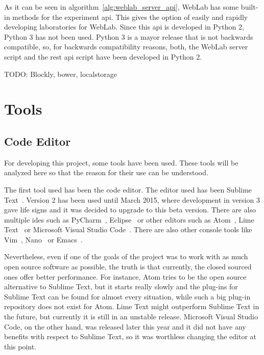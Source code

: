 As it can be seen in algorithm~\ref{alg:weblab_server_api}, WebLab has some built-in methods for the
experiment \acrshort{api}. This gives the option of easily and rapidly developing laboratories for
WebLab. Since this \acrshort{api} is developed in Python 2, Python 3 has not been used. Python 3 is
a mayor release that is not backwards compatible, so, for backwards compatibility reasons, both, the
WebLab server script and the \acrshort{rest} \acrshort{api} script have been developed in Python 2.

TODO: Blockly, bower, localstorage

\section{Tools}

\subsection{Code Editor}

For developing this project, some tools have been used. These tools will be analyzed here so that
the reason for their use can be understood.

The first tool used has been the code editor. The editor used has been Sublime
Text~\cite{sublime_web}. Version 2 has been used until March 2015, where development in version 3
gave life signs and it was decided to upgrade to this beta version. There are also multiple
\acrshort{ide}s such as PyCharm~\cite{pycharm_web}, Eclipse~\cite{eclipse_web} or other editors such
as Atom~\cite{atom_web}, Lime Text~\cite{lime_web} or Microsoft Visual Studio
Code~\cite{ms_code_web}. There are also other console tools like Vim~\cite{vim_web},
Nano~\cite{nano_web} or Emacs~\cite{emacs_web}.

Nevertheless, even if one of the goals of the project was to work with as much open source software
as possible, the truth is that currently, the closed sourced ones offer better performance. For
instance, Atom tries to be the open source alternative to Sublime Text, but it starts really slowly
and the plug-ins for Sublime Text can be found for almost every situation, while such a big plug-in
repository does not exist for Atom. Lime Text might outperform Sublime Text in the future, but
currently it is still in an unstable release. Microsoft Visual Studio Code, on the other hand, was
released later this year and it did not have any benefits with respect to Sublime Text, so it was
worthless changing the editor at this point.

